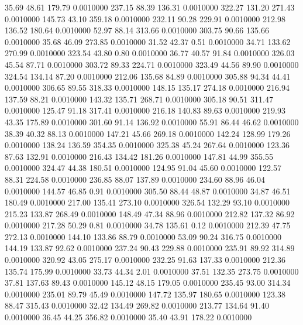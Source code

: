   35.69   48.61  179.79   0.0010000
 237.15   88.39  136.31   0.0010000
 322.27  131.20  271.43   0.0010000
 145.73   43.10  359.18   0.0010000
 232.11   90.28  229.91   0.0010000
 212.98  136.52  180.64   0.0010000
  52.97   88.14  313.66   0.0010000
 303.75   90.66  135.66   0.0010000
  35.68   46.09  273.85   0.0010000
  31.52   42.37    0.51   0.0010000
  34.71  133.62  270.99   0.0010000
 323.54   43.80    0.80   0.0010000
  36.77   40.57   91.84   0.0010000
 326.03   45.54   87.71   0.0010000
 303.72   89.33  224.71   0.0010000
 323.49   44.56   89.90   0.0010000
 324.54  134.14   87.20   0.0010000
 212.06  135.68   84.89   0.0010000
 305.88   94.34   44.41   0.0010000
 306.65   89.55  318.33   0.0010000
 148.15  135.17  274.18   0.0010000
 216.94  137.59   88.21   0.0010000
 143.32  135.71  268.71   0.0010000
 305.18   90.51  311.47   0.0010000
 125.47   91.18  317.41   0.0010000
 216.18  140.83   89.63   0.0010000
 219.93   43.35  175.89   0.0010000
 301.60   91.14  136.92   0.0010000
  55.91   86.44   46.62   0.0010000
  38.39   40.32   88.13   0.0010000
 147.21   45.66  269.18   0.0010000
 142.24  128.99  179.26   0.0010000
 138.24  136.59  354.35   0.0010000
 325.38   45.24  267.64   0.0010000
 123.36   87.63  132.91   0.0010000
 216.43  134.42  181.26   0.0010000
 147.81   44.99  355.55   0.0010000
 324.47   44.38  180.51   0.0010000
 124.95   91.04   45.60   0.0010000
 122.57   88.31  224.58   0.0010000
 236.85   88.07  137.89   0.0010000
 234.60   88.96   46.04   0.0010000
 144.57   46.85    0.91   0.0010000
 305.50   88.44   48.87   0.0010000
  34.87   46.51  180.49   0.0010000
 217.00  135.41  273.10   0.0010000
 326.54  132.29   93.10   0.0010000
 215.23  133.87  268.49   0.0010000
 148.49   47.34   88.96   0.0010000
 212.82  137.32   86.92   0.0010000
 217.28   50.29    0.81   0.0010000
  34.78  135.61    0.12   0.0010000
 212.39   47.75  272.13   0.0010000
 144.10  133.86   88.79   0.0010000
  53.09   90.24  316.75   0.0010000
 144.19  133.87   92.62   0.0010000
 237.24   90.43  229.88   0.0010000
 235.91   89.92  314.89   0.0010000
 320.92   43.05  275.17   0.0010000
 232.25   91.63  137.33   0.0010000
 212.36  135.74  175.99   0.0010000
  33.73   44.34    2.01   0.0010000
  37.51  132.35  273.75   0.0010000
  37.81  137.63   89.43   0.0010000
 145.12   48.15  179.05   0.0010000
 235.45   93.00  314.34   0.0010000
 235.01   89.79   45.49   0.0010000
 147.72  135.97  180.65   0.0010000
 123.38   88.47  315.43   0.0010000
  32.42  134.49  269.82   0.0010000
 213.77  134.64   91.40   0.0010000
  36.45   44.25  356.82   0.0010000
  35.40   43.91  178.22   0.0010000
